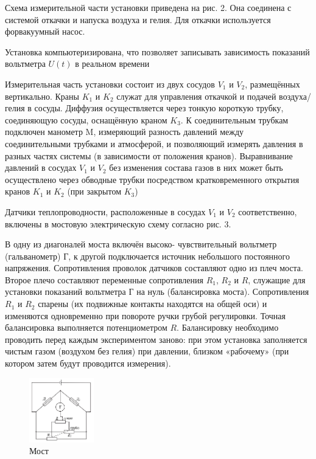 \documentclass[a4paper]{article}
\begin{document}
Схема измерительной части установки приведена на рис. 2.
Она соединена с системой откачки и напуска воздуха и гелия.
Для откачки используется форвакуумный насос.

Установка компьютеризирована, что позволяет записывать
зависимость показаний вольтметра $U(t)$ в реальном времени

Измерительная часть установки состоит из двух сосудов $V_1$ и $V_2$,
размещённых вертикально. Краны $K_1$ и $K_2$ служат для управления откачкой и
подачей воздуха/гелия в сосуды. Диффузия осуществляется через тонкую
короткую трубку, соединяющую сосуды, оснащённую краном $K_3$.
К соединительным трубкам подключен манометр M,
измеряющий разность давлений между соединительными трубками и атмосферой,
и позволяющий измерять давления в разных частях системы (в зависимости от положения
кранов).
Выравнивание давлений в сосудах $V_1$ и $V_2$ без изменения состава газов в
них может быть осуществлено через обводные трубки
посредством кратковременного открытия кранов $K_1$ и $K_2$ (при закрытом $K_3$)

Датчики теплопроводности, расположенные в сосудах $V_1$ и $V_2$ соответственно,
включены в мостовую электрическую схему согласно рис. 3.

В одну из диагоналей
моста включён высоко-
чувствительный вольтметр (гальванометр) Г,
к другой подключается источник небольшого постоянного
напряжения. Сопротивления проволок датчиков
составляют одно из плеч моста. Второе
плечо составляют переменные сопротивления
$R_1$, $R_2$ и $R$, служащие для установки показаний
вольтметра Г на нуль (балансировка моста).
Сопротивления $R_1$ и $R_2$ спарены (их подвижные контакты находятся
на общей оси) и изменяются одновременно при повороте ручки грубой
регулировки. Точная балансировка выполняется потенциометром $R$.
Балансировку необходимо проводить перед каждым экспериментом заново: при
этом установка заполняется чистым газом (воздухом без гелия) при давлении,
близком «рабочему» (при котором затем будут проводится измерения).

\begin{figure}[h!]
    \centering
    \includegraphics[width = 0.25\textwidth]{most.png}
    \caption{Мост}
\end{figure}
\end{document}
